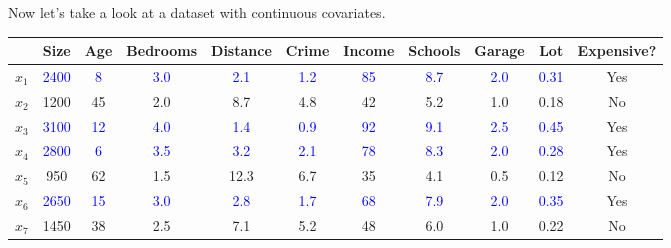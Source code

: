   \begin{example}
    \label{ex:continuous-covariates}
    Now let's take a look at a dataset with continuous covariates. 

    \begin{table}[H]
      \centering
      {\footnotesize 
      \begin{tabular}{|c|c|c|c|c|c|c|c|c|c|c|}
        \hline
        & Size & Age & Bedrooms & Distance & Crime & Income & Schools & Garage & Lot & Expensive? \\
        \hline
        $x_1$ & \textcolor{blue}{2400} & \textcolor{blue}{8} & \textcolor{blue}{3.0} & \textcolor{blue}{2.1} & \textcolor{blue}{1.2} & \textcolor{blue}{85} & \textcolor{blue}{8.7} & \textcolor{blue}{2.0} & \textcolor{blue}{0.31} & Yes \\
        \hline
        $x_2$ & \textcolor{green!50!black}{1200} & \textcolor{green!50!black}{45} & \textcolor{green!50!black}{2.0} & \textcolor{green!50!black}{8.7} & \textcolor{green!50!black}{4.8} & \textcolor{green!50!black}{42} & \textcolor{green!50!black}{5.2} & \textcolor{green!50!black}{1.0} & \textcolor{green!50!black}{0.18} & No \\
        \hline
        $x_3$ & \textcolor{blue}{3100} & \textcolor{blue}{12} & \textcolor{blue}{4.0} & \textcolor{blue}{1.4} & \textcolor{blue}{0.9} & \textcolor{blue}{92} & \textcolor{blue}{9.1} & \textcolor{blue}{2.5} & \textcolor{blue}{0.45} & Yes \\
        \hline
        $x_4$ & \textcolor{blue}{2800} & \textcolor{blue}{6} & \textcolor{blue}{3.5} & \textcolor{blue}{3.2} & \textcolor{blue}{2.1} & \textcolor{blue}{78} & \textcolor{blue}{8.3} & \textcolor{blue}{2.0} & \textcolor{blue}{0.28} & Yes \\
        \hline
        $x_5$ & \textcolor{green!50!black}{950} & \textcolor{green!50!black}{62} & \textcolor{green!50!black}{1.5} & \textcolor{green!50!black}{12.3} & \textcolor{green!50!black}{6.7} & \textcolor{green!50!black}{35} & \textcolor{green!50!black}{4.1} & \textcolor{green!50!black}{0.5} & \textcolor{green!50!black}{0.12} & No \\
        \hline
        $x_6$ & \textcolor{blue}{2650} & \textcolor{blue}{15} & \textcolor{blue}{3.0} & \textcolor{blue}{2.8} & \textcolor{blue}{1.7} & \textcolor{blue}{68} & \textcolor{blue}{7.9} & \textcolor{blue}{2.0} & \textcolor{blue}{0.35} & Yes \\
        \hline
        $x_7$ & \textcolor{green!50!black}{1450} & \textcolor{green!50!black}{38} & \textcolor{green!50!black}{2.5} & \textcolor{green!50!black}{7.1} & \textcolor{green!50!black}{5.2} & \textcolor{green!50!black}{48} & \textcolor{green!50!black}{6.0} & \textcolor{green!50!black}{1.0} & \textcolor{green!50!black}{0.22} & No \\

\end{tabular}}
\end{table}
\end{example}

